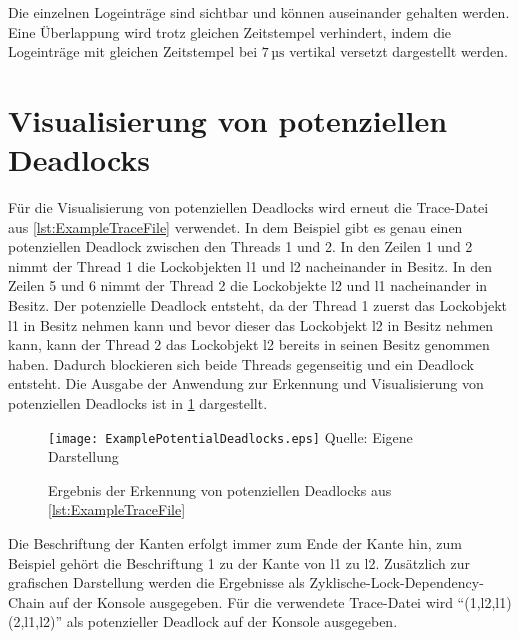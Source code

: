 Die einzelnen Logeinträge sind sichtbar und können auseinander gehalten werden.
Eine Überlappung wird trotz gleichen Zeitstempel verhindert, indem die
Logeinträge mit gleichen Zeitstempel bei $7\,\textrm{µs}$ vertikal versetzt
dargestellt werden.

\section{Visualisierung von potenziellen Deadlocks}
\label{section:DeadlockVisualization}
Für die Visualisierung von potenziellen Deadlocks wird erneut die Trace-Datei
aus \cref{lst:ExampleTraceFile} verwendet. In dem Beispiel gibt es genau einen
potenziellen Deadlock zwischen den Threads \textrm{1} und \textrm{2}. In den
Zeilen 1 und 2 nimmt der Thread \textrm{1} die Lockobjekten \textrm{l1} und
\textrm{l2} nacheinander in Besitz. In den Zeilen 5 und 6 nimmt der Thread
\textrm{2} die Lockobjekte \textrm{l2} und \textrm{l1} nacheinander in Besitz.
Der potenzielle Deadlock entsteht, da der Thread \textrm{1} zuerst das
Lockobjekt \textrm{l1} in Besitz nehmen kann und bevor dieser das Lockobjekt
\textrm{l2} in Besitz nehmen kann, kann der Thread \textrm{2} das Lockobjekt
\textrm{l2} bereits in seinen Besitz genommen haben. Dadurch blockieren sich
beide Threads gegenseitig und ein Deadlock entsteht. Die Ausgabe der Anwendung
zur Erkennung und Visualisierung von potenziellen Deadlocks ist in
\cref{fig:DeadlockVisualization} dargestellt.
\begin{figure}[ht]
  \texttt{[image: ExamplePotentialDeadlocks.eps]}
  \footnotesize\sffamily Quelle: Eigene Darstellung
  \caption{Ergebnis der Erkennung von potenziellen Deadlocks aus \cref{lst:ExampleTraceFile}}
  \label{fig:DeadlockVisualization}
\end{figure}
Die Beschriftung der Kanten erfolgt immer zum Ende der Kante hin, zum Beispiel
gehört die Beschriftung \textrm{1} zu der Kante von \textrm{l1} zu \textrm{l2}.
Zusätzlich zur grafischen Darstellung werden die Ergebnisse als
Zyklische-Lock-Dependency-Chain auf der Konsole ausgegeben. Für die verwendete
Trace-Datei wird "`(1,l2,{l1}) (2,l1,{l2})"' als potenzieller Deadlock auf der
Konsole ausgegeben.